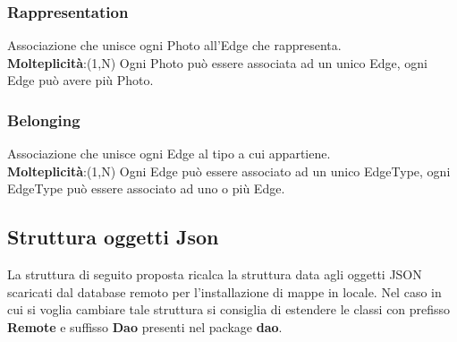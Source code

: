 \documentclass[../ManualeSviluppatore.tex]{subfiles}
\begin{document}
		\subsubsection{Rappresentation}
			Associazione che unisce ogni Photo all'Edge che rappresenta. \\
			\textbf{Molteplicità}:(1,N) Ogni Photo può essere associata ad un unico Edge, ogni Edge può avere più Photo.

		\subsubsection{Belonging}
			Associazione che unisce ogni Edge al tipo a cui appartiene.\\
			\textbf{Molteplicità}:(1,N) Ogni Edge può essere associato ad un unico EdgeType, ogni EdgeType può essere associato ad uno o più Edge.
		
	
	
	\subsection{Struttura oggetti Json}
	\label{sec:Json}
		La struttura di seguito proposta ricalca la struttura data agli oggetti JSON scaricati dal database remoto per l'installazione di mappe in locale. Nel caso in cui si voglia cambiare tale struttura si consiglia di estendere le classi con prefisso \textbf{Remote} e suffisso \textbf{Dao} presenti nel package \textbf{dao}.
	
\end{document}
